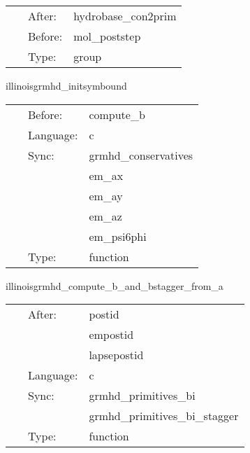 \documentclass{article}
\begin{document}
\hspace{5mm}

 \begin{tabular*}{160mm}{cll} 
~ & After:  & hydrobase\_con2prim \\ 
~ & Before:  & mol\_poststep \\ 
~ & Type:  & group \\ 
\end{tabular*} 


\vspace{5mm}


\hspace{5mm} illinoisgrmhd\_initsymbound 

\hspace{5mm}{\it schedule symmetries -- actually just a placeholder function to ensure prolongations / processor syncs are done before outer boundaries are updated. } 


\hspace{5mm}

 \begin{tabular*}{160mm}{cll} 
~ & Before:  & compute\_b \\ 
~ & Language:  & c \\ 
~ & Sync:  & grmhd\_conservatives \\ 
~& ~ &em\_ax\\ 
~& ~ &em\_ay\\ 
~& ~ &em\_az\\ 
~& ~ &em\_psi6phi\\ 
~ & Type:  & function \\ 
\end{tabular*} 


\vspace{5mm}


\hspace{5mm} illinoisgrmhd\_compute\_b\_and\_bstagger\_from\_a 

\hspace{5mm}{\it compute b and b\_stagger from a sync: grmhd\_primitives\_bi,grmhd\_primitives\_bi\_stagger } 


\hspace{5mm}

 \begin{tabular*}{160mm}{cll} 
~ & After:  & postid \\ 
~& ~ &empostid\\ 
~& ~ &lapsepostid\\ 
~ & Language:  & c \\ 
~ & Sync:  & grmhd\_primitives\_bi \\ 
~& ~ &grmhd\_primitives\_bi\_stagger\\ 
~ & Type:  & function \\ 
\end{tabular*} 
\end{document}
